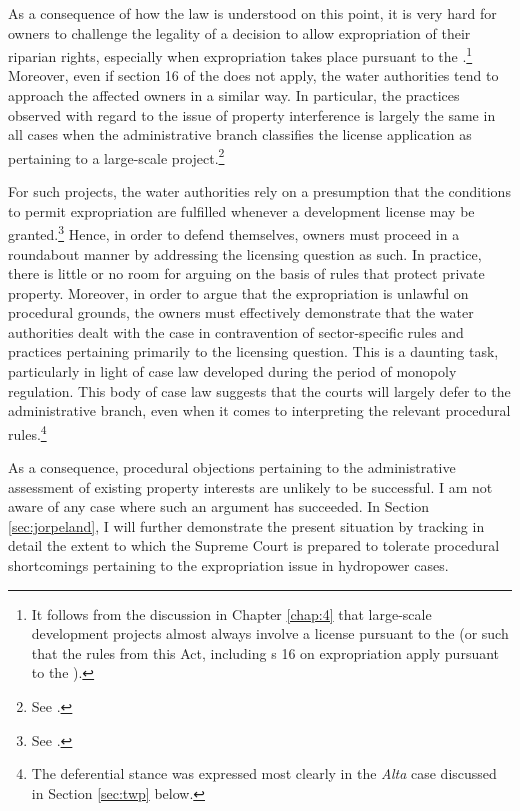 As a consequence of how the law is understood on this point, it is very hard for owners to challenge the legality of a decision to allow expropriation of their riparian rights, especially when expropriation takes place pursuant to the \cite{wra17}.\footnote{It follows from the discussion in Chapter \ref{chap:4} that large-scale development projects almost always involve a license pursuant to the \cite{wra17} (or such that the rules from this Act, including s 16 on expropriation apply pursuant to the \cite{wra00}).} Moreover, even if section 16 of the \cite{wra17} does not apply, the water authorities tend to approach the affected owners in a similar way. In particular, the practices observed with regard to the issue of property interference is largely the same in all cases when the administrative branch classifies the license application as pertaining to a large-scale project.\footnote{See \cite{flatby08}.}

For such projects, the water authorities rely on a presumption that the conditions to permit expropriation are fulfilled whenever a development license may be granted.\footnote{See \cite{flatby08}.} Hence, in order to defend themselves, owners must proceed in a roundabout manner by addressing the licensing question as such. In practice, there is little or no room for arguing on the basis of rules that protect private property.    Moreover, in order to argue that the expropriation is unlawful on procedural grounds, the owners must effectively demonstrate that the water authorities dealt with the case in contravention of sector-specific rules and practices pertaining primarily to the licensing question. This is a daunting task, particularly in light of case law developed during the period of monopoly regulation. This body of case law suggests that the courts will largely defer to the administrative branch, even when it comes to interpreting the relevant procedural rules.\footnote{The deferential stance was expressed most clearly in the {\it Alta} case discussed in Section \ref{sec:twp} below.}

As a consequence, procedural objections pertaining to the administrative assessment of existing property interests are unlikely to be successful. I am not aware of any case where such an argument has succeeded. In Section \ref{sec:jorpeland}, I will further demonstrate the present situation by tracking in detail the extent to which the Supreme Court is prepared to tolerate procedural shortcomings pertaining to the expropriation issue in hydropower cases.%

